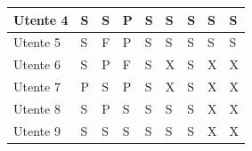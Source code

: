 \begin{table}[ht]
{\begin{tabular}{l|l|l|l|l|l|l|l|l|}
                \multicolumn{1}{|l|}{Utente 4} & S & S & P & S & S & S & S & S \\ \hline
                \multicolumn{1}{|l|}{Utente 5} & S & F & P & S & S & S & S & S \\ \hline
                \multicolumn{1}{|l|}{Utente 6} & S & P & F & S & X & S & X & X \\ \hline %
                \multicolumn{1}{|l|}{Utente 7} & P & S & P & S & X & S & X & X \\ \hline %
                \multicolumn{1}{|l|}{Utente 8} & S & P & S & S & S & S & X & X \\ \hline %
                \multicolumn{1}{|l|}{Utente 9} & S & S & S & S & S & S & X & X \\ \hline %
                \end{tabular}
                }
            \end{table}
            

